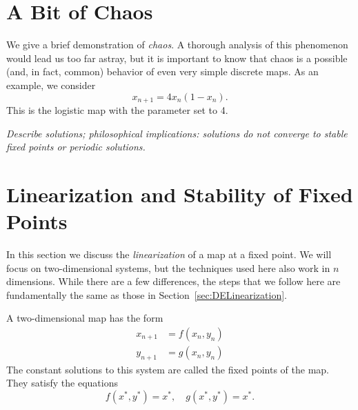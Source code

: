 \documentclass[reqno]{immbook}
\numberwithin{equation}{chapter}
\numberwithin{question}{section}
\numberwithin{theorem}{chapter}
\numberwithin{figure}{chapter}
\theoremstyle{definition}
\begin{document}
%
\section{A Bit of Chaos}
We give a brief demonstration of \emph{chaos}.
A thorough analysis of this phenomenon would lead us too far
astray, but it is important to know that chaos is a possible
(and, in fact, common) behavior of even very simple
discrete maps.
As an example, we consider
\begin{equation}
   x_{n+1} = 4x_n(1-x_n).
\end{equation}
This is the logistic map with the parameter set to 4.

\emph{Describe solutions; philosophical implications: solutions
do not converge to stable fixed points or periodic solutions.}
%

\section{Linearization and Stability of Fixed Points}
%
In this section we discuss the \emph{linearization}
of a map at a fixed point. 
We will focus on two-dimensional systems, but the
techniques used here also work in $n$ dimensions.
While there are a few differences, the steps that
we follow here are fundamentally the same as those
in Section~\ref{sec:DELinearization}.

A two-dimensional map has the form
\begin{equation}
\begin{split}
  x_{n+1} & = f(x_n,y_n) \\
  y_{n+1} & = g(x_n,y_n)
\end{split}
\label{eqn:map}
\end{equation}
The constant solutions to this system are called the fixed points
of the map.
They satisfy the equations
\begin{equation}
    f(x^*,y^*) = x^*, \quad g(x^*,y^*) = x^*.
\end{equation}
\end{document}

